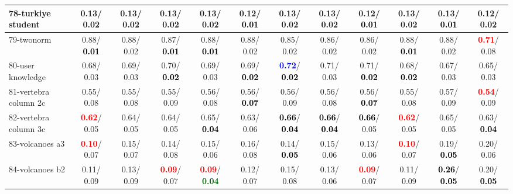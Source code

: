 \begin{table}[h]
\begin{center}
{\begin{tabular}{lc|c|c|c|c|c|c|c|c|c|c}
78-turkiye student &   0.13/  0.02 &   0.13/  0.02 &   0.13/  0.02 &   0.13/  0.02 &   0.12/\textcolor{black}{\textbf{  0.01}} &   0.13/  0.02 &   0.13/  0.02 &   0.12/\textcolor{black}{\textbf{  0.01}} &   0.13/  0.02 &   0.13/\textcolor{black}{\textbf{  0.01}} &   0.12/  0.02 \\ \hline
79-twonorm &   0.88/\textcolor{black}{\textbf{  0.01}} &   0.88/  0.02 &   0.87/\textcolor{black}{\textbf{  0.01}} &   0.88/\textcolor{black}{\textbf{  0.01}} &   0.88/  0.02 &   0.85/  0.02 &   0.86/  0.02 &   0.86/  0.02 &   0.88/\textcolor{black}{\textbf{  0.01}} &   0.88/  0.02 & \textcolor{red}{\textbf{  0.71}}/  0.08 \\
80-user knowledge &   0.68/  0.03 &   0.69/  0.03 &   0.70/\textcolor{black}{\textbf{  0.02}} &   0.69/  0.03 &   0.69/\textcolor{black}{\textbf{  0.02}} & \textcolor{blue}{\textbf{  0.72}}/\textcolor{black}{\textbf{  0.02}} &   0.71/  0.03 &   0.71/\textcolor{black}{\textbf{  0.02}} &   0.68/\textcolor{black}{\textbf{  0.02}} &   0.67/  0.03 &   0.65/  0.03 \\
81-vertebra column 2c &   0.55/  0.08 &   0.55/  0.08 &   0.55/  0.09 &   0.56/  0.08 &   0.56/\textcolor{black}{\textbf{  0.07}} &   0.56/  0.09 &   0.56/  0.08 &   0.56/\textcolor{black}{\textbf{  0.07}} &   0.55/  0.08 &   0.57/  0.09 & \textcolor{red}{\textbf{  0.54}}/  0.09 \\
82-vertebra column 3c & \textcolor{red}{\textbf{  0.62}}/  0.05 &   0.64/  0.05 &   0.64/  0.05 &   0.65/\textcolor{black}{\textbf{  0.04}} &   0.63/  0.06 & \textcolor{black}{\textbf{  0.66}}/\textcolor{black}{\textbf{  0.04}} & \textcolor{black}{\textbf{  0.66}}/\textcolor{black}{\textbf{  0.04}} & \textcolor{black}{\textbf{  0.66}}/  0.05 & \textcolor{red}{\textbf{  0.62}}/  0.05 &   0.65/  0.05 &   0.63/\textcolor{black}{\textbf{  0.04}} \\
83-volcanoes a3 & \textcolor{red}{\textbf{  0.10}}/  0.07 &   0.15/  0.07 &   0.14/  0.08 &   0.15/  0.06 &   0.16/  0.08 &   0.14/\textcolor{black}{\textbf{  0.05}} &   0.15/  0.06 &   0.13/  0.06 & \textcolor{red}{\textbf{  0.10}}/  0.07 &   0.19/\textcolor{black}{\textbf{  0.05}} &   0.20/  0.06 \\
84-volcanoes b2 &   0.11/  0.09 &   0.13/  0.09 & \textcolor{red}{\textbf{  0.09}}/  0.07 & \textcolor{red}{\textbf{  0.09}}/\textcolor{darkgreen}{\textbf{  0.04}} &   0.12/  0.07 &   0.15/  0.08 &   0.13/  0.06 & \textcolor{red}{\textbf{  0.09}}/  0.07 &   0.11/  0.09 & \textcolor{black}{\textbf{  0.26}}/\textcolor{black}{\textbf{  0.05}} &   0.20/\textcolor{black}{\textbf{  0.05}} \\

\end{tabular}}
\end{center}
\end{table}
